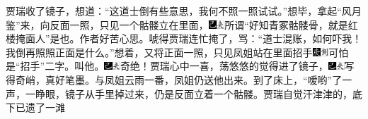 贾瑞收了镜子，想道：``这道士倒有些意思，我何不照一照试试。''想毕，拿起``风月鉴''来，向反面一照，只见一个骷髅立在里面，{\includegraphics[width=3mm]{../Images/00003}\includegraphics[width=3mm]{../Images/00012}\footnotesize \kaishu 所谓``好知青冢骷髅骨，就是红楼掩面人''是也。作者好苦心思。}唬得贾瑞连忙掩了，骂：``道士混账，如何吓我！我倒再照照正面是什么。''想着，又将正面一照，只见凤姐站在里面招手{\includegraphics[width=3mm]{../Images/00004}\includegraphics[width=3mm]{../Images/00011}\footnotesize \kaishu 可怕是``招手''二字。}叫他。{\includegraphics[width=3mm]{../Images/00003}\includegraphics[width=3mm]{../Images/00012}\footnotesize \kaishu 奇绝！}贾瑞心中一喜，荡悠悠的觉得进了镜子，{\includegraphics[width=3mm]{../Images/00003}\includegraphics[width=3mm]{../Images/00012}\footnotesize \kaishu 写得奇峭，真好笔墨。}与凤姐云雨一番，凤姐仍送他出来。到了床上，``嗳哟''了一声，一睁眼，镜子从手里掉过来，仍是反面立着一个骷髅。贾瑞自觉汗津津的，底下已遗了一滩